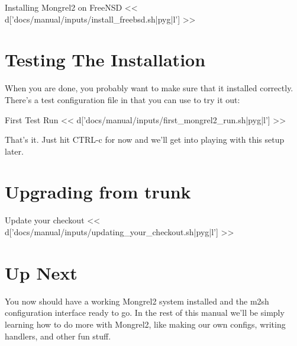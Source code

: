 \begin{code}{Installing Mongrel2 on FreeNSD}
<< d['docs/manual/inputs/install_freebsd.sh|pyg|l'] >>
\end{code}

\section{Testing The Installation}

When you are done, you probably want to make sure that it installed correctly.
There's a test configuration file in  that you can
use to try it out:

\begin{code}{First Test Run}
<< d['docs/manual/inputs/first_mongrel2_run.sh|pyg|l'] >>
\end{code}

That's it.  Just hit CTRL-c for now and we'll get into playing with this
setup later.

\section{Upgrading from trunk}
\begin{code}{Update your checkout}
<< d['docs/manual/inputs/updating_your_checkout.sh|pyg|l'] >>
\end{code}



\section{Up Next}

You now should have a working Mongrel2 system installed and the m2sh configuration
interface ready to go.  In the rest of this manual we'll be simply learning how
to do more with Mongrel2, like making our own configs, writing handlers, and other
fun stuff.


